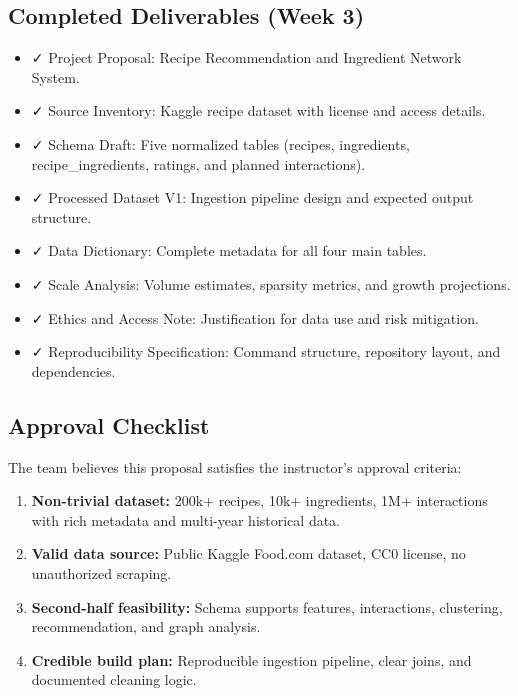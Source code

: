 \documentclass[11pt,a4paper]{article}
\begin{document}
\subsection{Completed Deliverables (Week 3)}

\begin{itemize}
    \item ✓ Project Proposal: Recipe Recommendation and Ingredient Network System.
    \item ✓ Source Inventory: Kaggle recipe dataset with license and access details.
    \item ✓ Schema Draft: Five normalized tables (recipes, ingredients, recipe\_ingredients, ratings, and planned interactions).
    \item ✓ Processed Dataset V1: Ingestion pipeline design and expected output structure.
    \item ✓ Data Dictionary: Complete metadata for all four main tables.
    \item ✓ Scale Analysis: Volume estimates, sparsity metrics, and growth projections.
    \item ✓ Ethics and Access Note: Justification for data use and risk mitigation.
    \item ✓ Reproducibility Specification: Command structure, repository layout, and dependencies.
\end{itemize}

\subsection{Approval Checklist}

The team believes this proposal satisfies the instructor's approval criteria:

\begin{enumerate}
    \item[\checkmark] \textbf{Non-trivial dataset:} 200k+ recipes, 10k+ ingredients, 1M+ interactions with rich metadata and multi-year historical data.
    \item[\checkmark] \textbf{Valid data source:} Public Kaggle Food.com dataset, CC0 license, no unauthorized scraping.
    \item[\checkmark] \textbf{Second-half feasibility:} Schema supports features, interactions, clustering, recommendation, and graph analysis.
    \item[\checkmark] \textbf{Credible build plan:} Reproducible ingestion pipeline, clear joins, and documented cleaning logic.
\end{enumerate}
\end{document}
